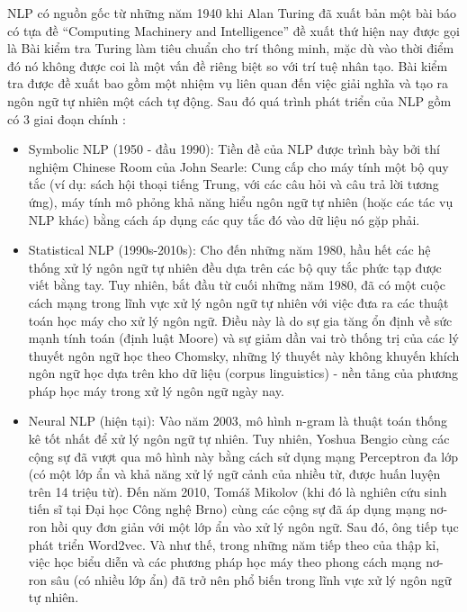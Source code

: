 NLP có nguồn gốc từ những năm 1940 khi Alan Turing đã xuất bản một bài báo có tựa đề ``Computing Machinery and Intelligence'' đề xuất thứ hiện nay được gọi là Bài kiểm tra Turing làm tiêu chuẩn cho trí thông minh, mặc dù vào thời điểm đó nó không được coi là một vấn đề riêng biệt so với trí tuệ nhân tạo. Bài kiểm tra được đề xuất bao gồm một nhiệm vụ liên quan đến việc giải nghĩa và tạo ra ngôn ngữ tự nhiên một cách tự động. Sau đó quá trình phát triển của NLP gồm có 3 giai đoạn chính \cite{webpage24}:
\begin{itemize}
    \item Symbolic NLP (1950 - đầu 1990): Tiền đề của NLP được trình bày bởi thí nghiệm Chinese Room của John Searle: Cung cấp cho máy tính một bộ quy tắc (ví dụ: sách hội thoại tiếng Trung, với các câu hỏi và câu trả lời tương ứng), máy tính mô phỏng khả năng hiểu ngôn ngữ tự nhiên (hoặc các tác vụ NLP khác) bằng cách áp dụng các quy tắc đó vào dữ liệu nó gặp phải.
    \item Statistical NLP (1990s-2010s): Cho đến những năm 1980, hầu hết các hệ thống xử lý ngôn ngữ tự nhiên đều dựa trên các bộ quy tắc phức tạp được viết bằng tay. Tuy nhiên, bắt đầu từ cuối những năm 1980, đã có một cuộc cách mạng trong lĩnh vực xử lý ngôn ngữ tự nhiên với việc đưa ra các thuật toán học máy cho xử lý ngôn ngữ. Điều này là do sự gia tăng ổn định về sức mạnh tính toán (định luật Moore) và sự giảm dần vai trò thống trị của các lý thuyết ngôn ngữ học theo Chomsky, những lý thuyết này không khuyến khích ngôn ngữ học dựa trên kho dữ liệu (corpus linguistics) - nền tảng của phương pháp học máy trong xử lý ngôn ngữ ngày nay.
    \item Neural NLP (hiện tại): Vào năm 2003, mô hình n-gram là thuật toán thống kê tốt nhất để xử lý ngôn ngữ tự nhiên. Tuy nhiên, Yoshua Bengio cùng các cộng sự đã vượt qua mô hình này bằng cách sử dụng mạng Perceptron đa lớp (có một lớp ẩn và khả năng xử lý ngữ cảnh của nhiều từ, được huấn luyện trên 14 triệu từ). Đến năm 2010, Tomáš Mikolov (khi đó là nghiên cứu sinh tiến sĩ tại Đại học Công nghệ Brno) cùng các cộng sự đã áp dụng mạng nơ-ron hồi quy đơn giản với một lớp ẩn vào xử lý ngôn ngữ. Sau đó, ông tiếp tục phát triển Word2vec. Và như thế, trong những năm tiếp theo của thập kỉ, việc học biểu diễn và các phương pháp học máy theo phong cách mạng nơ-ron sâu (có nhiều lớp ẩn) đã trở nên phổ biến trong lĩnh vực xử lý ngôn ngữ tự nhiên.
\end{itemize}

